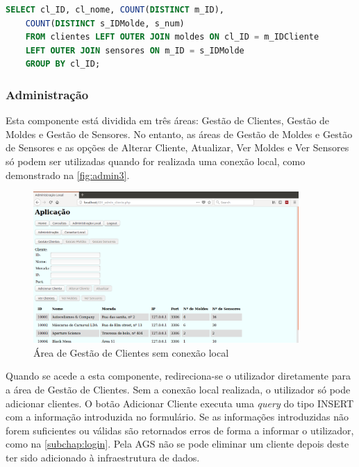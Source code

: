\documentclass[11pt,twoside,a4paper]{report}
\begin{document}
\begin{lstlisting}[language = SQL]
	SELECT cl_ID, cl_nome, COUNT(DISTINCT m_ID),
	COUNT(DISTINCT s_IDMolde, s_num)
	FROM clientes LEFT OUTER JOIN moldes ON cl_ID = m_IDCliente
	LEFT OUTER JOIN sensores ON m_ID = s_IDMolde
	GROUP BY cl_ID;
\end{lstlisting}

\subsubsection{Administração}
Esta componente está dividida em três áreas: Gestão de Clientes, Gestão de Moldes e Gestão de Sensores. No entanto, as áreas de Gestão de Moldes e Gestão de Sensores e as opções de Alterar Cliente, Atualizar, Ver Moldes e Ver Sensores só podem ser utilizadas quando for realizada uma conexão local, como demonstrado na \autoref{fig:admin3}.\par
\begin{figure}[H]
	\begin{center}
		\includegraphics[width=0.9\textwidth]{administracao03} %
		\caption{Área de Gestão de Clientes sem conexão local}
		\label{fig:admin3}
	\end{center}
\end{figure}
Quando se acede a esta componente, redireciona-se o utilizador diretamente para a área de Gestão de Clientes. Sem a conexão local realizada, o utilizador só pode adicionar clientes. O botão Adicionar Cliente executa uma \textit{query} do tipo INSERT com a informação introduzida no formulário. Se as informações introduzidas não forem suficientes ou válidas são retornados erros de forma a informar o utilizador, como na \autoref{subchap:login}. Pela AGS não se pode eliminar um cliente depois deste ter sido adicionado à infraestrutura de dados.\par
\end{document}
